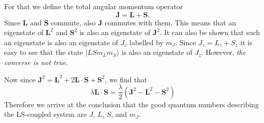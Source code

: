 For that we define the total angular momentum operator 
\begin{equation}
\mathbf{J} = \mathbf{L} + \mathbf{S}.
\end{equation}
Since $\mathbf{L}$ and  $\mathbf{S}$ commute, also $\mathbf{J}$ commutes with them. This means that an eigenstate of $\mathbf{L}^2$ and $\mathbf{S}^2$ is also an eigenstate of $\mathbf{J}^2$. It can also be shown that such an eigenstate is also an eigenstate of $J_z$ labelled by $m_J$. Since $J_z = L_z + S_z$ it is easy to see that the state $|LSm_Lm_S\rangle$ is also an eigenstate of $J_z$. However, \emph{the converse is not true}.

Now since $\mathbf{J}^2 = \mathbf{L}^2 + 2\mathbf{L} \cdot \mathbf{S} + \mathbf{S}^2$, we find that
\begin{equation}
\lambda \mathbf{L} \cdot \mathbf{S} = \frac{\lambda}{2}(\mathbf{J}^2-\mathbf{L}^2-\mathbf{S}^2 )
\end{equation}
Therefore we arrive at the conclusion that the good quantum numbers describing the LS-coupled system are $J$, $L$, $S$, and $m_J$.




 
\nocite{ashcroftmermin,blundell_book}


